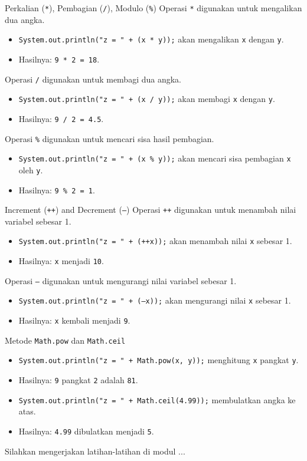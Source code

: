 \documentclass[aspectratio=169, table]{beamer}
\begin{document}
\begin{frame}{Perkalian (\texttt{*}), Pembagian (\texttt{/}), Modulo (\texttt{\%})}
\vspace{15pt}
		Operasi \texttt{*} digunakan untuk mengalikan dua angka.
	\begin{itemize}
		\item \texttt{System.out.println("z = " + (x * y));} akan mengalikan \texttt{x} dengan \texttt{y}.
		\item Hasilnya: \texttt{9 * 2 = 18}.
	\end{itemize}
	Operasi \texttt{/} digunakan untuk membagi dua angka.
	\begin{itemize}
		\item \texttt{System.out.println("z = " + (x / y));} akan membagi \texttt{x} dengan \texttt{y}.
		\item Hasilnya: \texttt{9 / 2 = 4.5}.
	\end{itemize}
		Operasi \texttt{\%} digunakan untuk mencari sisa hasil pembagian.
	\begin{itemize}
		\item \texttt{System.out.println("z = " + (x \% y));} akan mencari sisa pembagian \texttt{x} oleh \texttt{y}.
		\item Hasilnya: \texttt{9 \% 2 = 1}.
	\end{itemize}
\end{frame}


\begin{frame}{Increment (\texttt{++}) and Decrement (\texttt{--})}
	Operasi \texttt{++} digunakan untuk menambah nilai variabel sebesar 1.
	\begin{itemize}
		\item \texttt{System.out.println("z = " + (++x));} akan menambah nilai \texttt{x} sebesar 1.
		\item Hasilnya: \texttt{x} menjadi \texttt{10}.
	\end{itemize}
	Operasi \texttt{--} digunakan untuk mengurangi nilai variabel sebesar 1.
\begin{itemize}
	\item \texttt{System.out.println("z = " + (--x));} akan mengurangi nilai \texttt{x} sebesar 1.
	\item Hasilnya: \texttt{x} kembali menjadi \texttt{9}.
\end{itemize}
\end{frame}


\begin{frame}{Metode \texttt{Math.pow} dan \texttt{Math.ceil}}
	\begin{itemize}
		\item \texttt{System.out.println("z = " + Math.pow(x, y));} menghitung \texttt{x} pangkat \texttt{y}.
		\item Hasilnya: \texttt{9} pangkat \texttt{2} adalah \texttt{81}.
		\item \texttt{System.out.println("z = " + Math.ceil(4.99));} membulatkan angka ke atas.
		\item Hasilnya: \texttt{4.99} dibulatkan menjadi \texttt{5}.
	\end{itemize}
\end{frame}

\begin{frame}
	\centering
	\Huge Silahkan mengerjakan latihan-latihan di modul ...
\end{frame}
\end{document}
